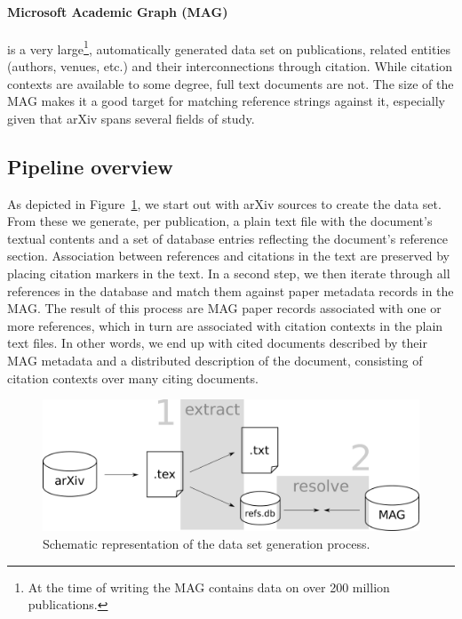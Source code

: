 \paragraph{Microsoft Academic Graph (MAG)} is a very large\footnote{At the time of writing the MAG contains data on over 200 million publications.}, automatically generated data set on publications, related entities (authors, venues, etc.) and their interconnections through citation. While citation contexts are available to some degree, full text documents are not. The size of the MAG makes it a good target for matching reference strings against it, especially given that arXiv spans several fields of study.

\subsection{Pipeline overview}

As depicted in Figure~\ref{fig:datagen}, we start out with arXiv sources to create the data set. From these we generate, per publication, a plain text file with the document's textual contents and a set of database entries reflecting the document's reference section. Association between references and citations in the text are preserved by placing citation markers in the text. In a second step, we then iterate through all references in the database and match them against paper metadata records in the MAG. The result of this process are MAG paper records associated with one or more references, which in turn are associated with citation contexts in the plain text files. In other words, we end up with cited documents described by their MAG metadata and a distributed description of the document, consisting of citation contexts over many citing documents.

\begin{figure}
  \centering
    \includegraphics[scale=0.2]{figures/dataset/data_set_generation_schema.pdf}
  \caption{Schematic representation of the data set generation process.}
  \label{fig:datagen}
\end{figure}

